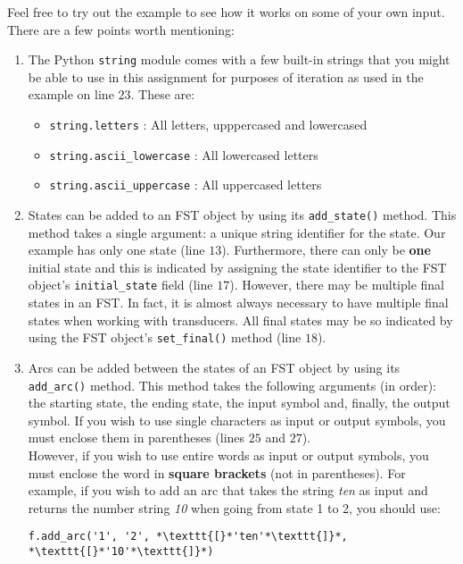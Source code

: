 \documentclass[11pt]{article}
\begin{document}
 Feel free to try out the example to see how it works on some of your
own input. There are a few points worth mentioning:
\begin{enumerate}
	\item The Python \texttt{string} module comes with a few
          built-in strings that you might be able to use in this
          assignment for purposes of iteration as used in the example
          on line $23$. These are:
	\begin{itemize}
		\item \texttt{string.letters} : All letters, upppercased and lowercased
		\item \texttt{string.ascii\_lowercase} : All lowercased letters
		\item \texttt{string.ascii\_uppercase} : All uppercased letters
	\end{itemize}
	\item States can be added to an FST object by using its
          \texttt{add\_state()} method. This method takes a single
          argument: a unique string identifier for the state. Our
          example has only one state (line $13$). Furthermore, there
          can only be \textbf{one} initial state and this is indicated
          by assigning the state identifier to the FST object's
          \texttt{initial\_state} field (line $17$). However, there
          may be multiple final states in an FST. In fact, it is
          almost always necessary to have multiple final states when
          working with transducers. All final states may be so
          indicated by using the FST object's \texttt{set\_final()}
          method (line $18$).
	\item Arcs can be added between the states of an FST object by
          using its \texttt{add\_arc()} method. This method takes the
          following arguments (in order): the starting state, the
          ending state, the input symbol and, finally, the output
          symbol. If you wish to use single characters as input or
          output symbols, you must enclose them in parentheses (lines
          $25$ and $27$).  \\

	 However, if you wish to use entire words as input or output
         symbols, you must enclose the word in \textbf{square
           brackets} (not in parentheses). For example, if you wish to
         add an arc that takes the string \emph{ten} as input and
         returns the number string \emph{10} when going from state 1
         to 2, you should use:
	\begin{lstlisting}[label=foo1, frame=trBL,escapechar=*]
	f.add_arc('1', '2', *\texttt{[}*'ten'*\texttt{]}*, *\texttt{[}*'10'*\texttt{]}*)
	\end{lstlisting}
	

\end{enumerate}
\end{document}

